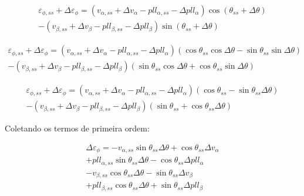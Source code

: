 \documentclass[12pt,a4paper]{report}
\begin{document}
\begin{multline}
\varepsilon_{\phi,ss} + \Delta \varepsilon_\phi =
\left(
v_{\alpha,ss} + \Delta v_{\alpha} 
- pll_{\alpha,ss} - \Delta pll_\alpha
\right)
\cos (\theta_{ss} + \Delta \theta)\\ -
\left(
v_{\beta,ss} + \Delta v_\beta 
- pll_{\beta,ss} - \Delta pll_\beta
\right)
\sin (\theta_{ss} + \Delta \theta )
\end{multline}



\begin{multline}
\varepsilon_{\phi,ss} + \Delta \varepsilon_\phi =
\left(
v_{\alpha,ss} + \Delta v_{\alpha} 
- pll_{\alpha,ss} - \Delta pll_\alpha
\right)
\left(
\cos \theta_{ss} \cos \Delta \theta -
\sin \theta_{ss} \sin \Delta \theta
\right)\\ -
\left(
v_{\beta,ss} + \Delta v_\beta 
- pll_{\beta,ss} - \Delta pll_\beta
\right)
\left(
\sin \theta_{ss} \cos \Delta \theta +
\cos \theta_{ss} \sin \Delta \theta
\right)
\end{multline}








\begin{multline}
\varepsilon_{\phi,ss} + \Delta \varepsilon_\phi =
\left(
v_{\alpha,ss} + \Delta v_{\alpha} 
- pll_{\alpha,ss} - \Delta pll_\alpha
\right)
\left(
\cos \theta_{ss}  -
\sin \theta_{ss}  \Delta \theta
\right)\\ -
\left(
v_{\beta,ss} + \Delta v_\beta 
- pll_{\beta,ss} - \Delta pll_\beta
\right)
\left(
\sin \theta_{ss}  +
\cos \theta_{ss}  \Delta \theta
\right)
\end{multline}


Coletando os termos de primeira ordem:


\begin{multline}
\Delta \varepsilon_\phi = 
-v_{\alpha,ss} \sin \theta_{ss}  \Delta \theta
+\cos \theta_{ss} \Delta v_{\alpha} \\
+pll_{\alpha,ss} \sin \theta_{ss}  \Delta \theta
- \cos \theta_{ss}  \Delta pll_\alpha \\
- v_{\beta,ss} \cos \theta_{ss}  \Delta \theta
- \sin \theta_{ss} \Delta v_\beta \\
+ pll_{\beta,ss} \cos \theta_{ss}  \Delta \theta
+ \sin \theta_{ss}  \Delta pll_\beta
\end{multline}
\end{document}
